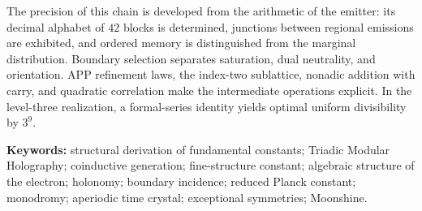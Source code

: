 \vspace{7pt}



The precision of this chain is developed from the arithmetic of the
emitter: its decimal alphabet of \(42\) blocks is determined, junctions
between regional emissions are exhibited, and ordered memory is
distinguished from the marginal distribution. Boundary selection separates
saturation, dual neutrality, and orientation. APP refinement laws, the
index-two sublattice, nonadic addition with carry, and quadratic correlation
make the intermediate operations explicit. In the level-three realization,
a formal-series identity yields optimal uniform divisibility by \(3^9\).

\noindent\textbf{Keywords:} structural derivation of fundamental constants;
Triadic Modular Holography; coinductive generation; fine-structure constant;
algebraic structure of the electron; holonomy; boundary incidence;
reduced Planck constant; monodromy; aperiodic time crystal;
exceptional symmetries; Moonshine.
\par\endgroup
